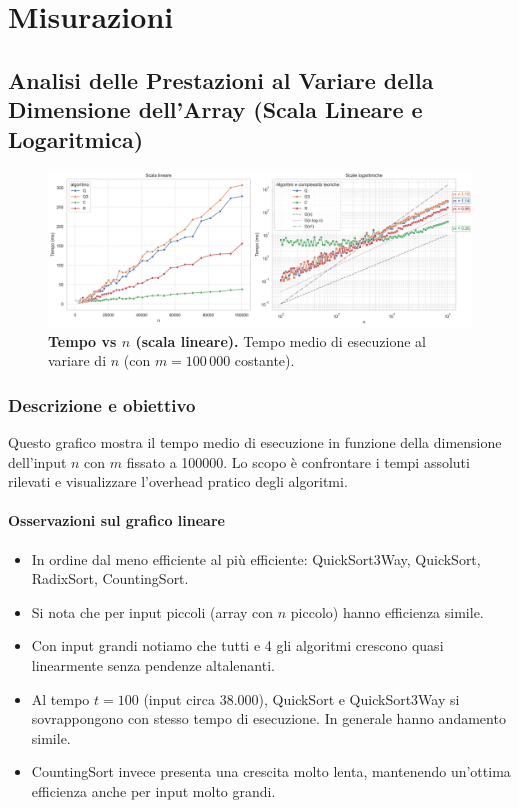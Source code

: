 \documentclass[a4paper, 11pt]{article}
\begin{document}
\section{Misurazioni}

\subsection{Analisi delle Prestazioni al Variare della Dimensione dell'Array (Scala Lineare e Logaritmica)}
\begin{figure}[H]
    \centering
    \includegraphics[width=\textwidth]{Immagini/confronto_DEFINITIVO.png}
    \caption*{\textbf{Tempo vs \(n\) (scala lineare).} Tempo medio di esecuzione al variare di \(n\) (con \(m=100\,000\) costante).}
    \label{fig:grafico}
\end{figure}

\subsubsection{Descrizione e obiettivo}
\label{descrizione-obiettivo}
Questo grafico mostra il tempo medio di esecuzione in funzione della dimensione dell'input \(n\) con \(m\) fissato a 100000. Lo scopo è confrontare i tempi assoluti rilevati e visualizzare l'overhead pratico degli algoritmi.

\paragraph{Osservazioni sul grafico lineare}
\begin{itemize}
  \item In ordine dal meno efficiente al più efficiente: QuickSort3Way, QuickSort, RadixSort, CountingSort.
  \item Si nota che per input piccoli (array con $n$ piccolo) hanno efficienza simile. 
  \item Con input grandi notiamo che tutti e 4 gli algoritmi crescono quasi linearmente senza pendenze altalenanti.
  \item Al tempo $t = 100$ (input circa $38.000$), QuickSort e QuickSort3Way si sovrappongono con stesso tempo di esecuzione. In generale hanno andamento simile.
  \item CountingSort invece presenta una crescita molto lenta, mantenendo un'ottima efficienza anche per input molto grandi.
\end{itemize}
\end{document}
